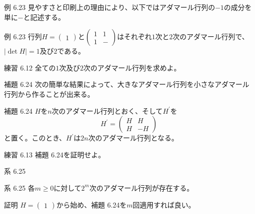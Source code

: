 \documentclass[dvipdfmx,10pt,jsarticle]{beamer}
\begin{document}
  \begin{frame}{例 6.23}
    見やすさと印刷上の理由により、以下ではアダマール行列の$-1$の成分を単に$-$と記述する。

    \begin{block}{例 6.23}
      行列$H = \begin{pmatrix} 1 \end{pmatrix}$と$\begin{pmatrix} 1 & 1 \\ 1 & -\end{pmatrix}$はそれぞれ$1$次と$2$次のアダマール行列で、$\mid \det H \mid = 1$及び$2$である。
    \end{block}
    \vspace{1cm}
    \begin{block}{練習 6.12}
        全ての$1$次及び$2$次のアダマール行列を求めよ。 \\
    \end{block}
  \end{frame}

  \begin{frame}{補題 6.24}
    次の簡単な結果によって、大きなアダマール行列を小さなアダマール行列から作ることが出来る。

    \begin{block}{補題 6.24}
      $H$を$n$次のアダマール行列とおく、そして$H^\prime$を
      \[H^\prime = \begin{pmatrix} H & H \\ H & -H\end{pmatrix}\]
      と置く。このとき、$H^\prime$は$2n$次のアダマール行列となる。
    \end{block}
    \vspace{1cm}
     \begin{block}{練習 6.13}
        補題 6.24を証明せよ。
    \end{block}
  \end{frame}

  \begin{frame}{系 6.25}
    \begin{block}{系 6.25}
      各$m \geq 0$に対して$2^m$次のアダマール行列が存在する。
    \end{block}
    \vspace{1cm}
      
    \begin{block}{証明}
        $H = \begin{pmatrix}  1\end{pmatrix}$から始め、補題 6.24を$m$回適用すれば良い。
    \end{block}
  \end{frame}
\end{document}
